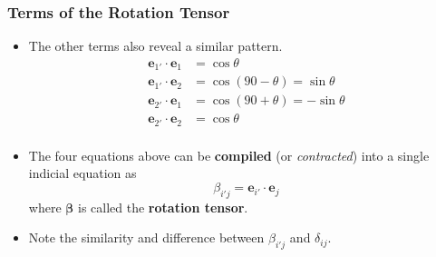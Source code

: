 \documentclass[11pt]{article}
\begin{document}
\subsubsection*{Terms of the Rotation Tensor}
\label{sec:orgc77338f}
\begin{itemize}
\item The other terms also reveal a similar pattern.
\begin{align}
 \boldsymbol{e}_{1'} \cdot \boldsymbol{e}_1 & = \cos\theta \\
 \boldsymbol{e}_{1'} \cdot \boldsymbol{e}_2 & = \cos(90-\theta) = \sin\theta \\
 \boldsymbol{e}_{2'} \cdot \boldsymbol{e}_1 & = \cos(90+\theta) = -\sin\theta \\
 \boldsymbol{e}_{2'} \cdot \boldsymbol{e}_2 & = \cos\theta \\
\end{align}
\end{itemize}
\begin{itemize}
\item The four equations above can be \textbf{compiled} (or \emph{contracted}) into a single indicial equation as
$$ \beta_{i'j} = \boldsymbol{e}_{i'} \cdot \boldsymbol{e}_j $$
where \(\boldsymbol\beta\) is called the \textbf{rotation tensor}.
\item Note the similarity and difference between \(\beta_{i'j}\) and \(\delta_{ij}\).
\end{itemize}
\end{document}
